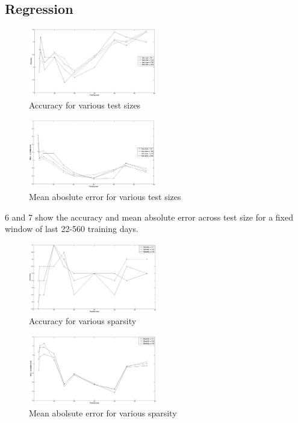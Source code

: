 \subsection{Regression}
\begin{figure}[H]
	\includegraphics[width=0.5\textwidth]{results/acc.jpg}
	\caption{Accuracy for various test sizes}
\end{figure}
\begin{figure}[H]
	\includegraphics[width=0.5\textwidth]{results/mae.jpg}
	\caption{Mean aboslute error for various test sizes}
\end{figure}
\figurename{6} and \figurename{7} show the accuracy and mean absolute error across test size for a fixed window of last 22-560 training days.
\begin{figure}[H]
	\includegraphics[width=0.5\textwidth]{results/acc2.jpg}
	\caption{Accuracy for various sparsity}
\end{figure}
\begin{figure}[H]
	\includegraphics[width=0.5\textwidth]{results/mae2.jpg}
	\caption{Mean abolsute error for various sparsity}
\end{figure}

